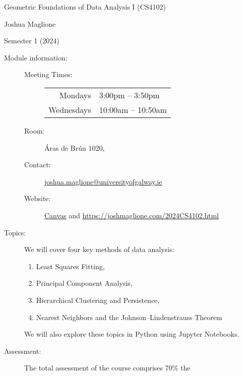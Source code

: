 \documentclass[a4paper, 12pt]{article}
\begin{document}
\pagestyle{empty}

\begin{center}
{\Large Geometric Foundations of Data Analysis I (CS4102)} 

\vspace{0.25cm}

{\large Joshua Maglione}

\vspace{0.25cm}

Semester 1 (2024)
\end{center}

\vspace{0.5cm}

\begin{description}
    \item[Module information:] \hfill
    \begin{description}
      \item[Meeting Times:] \hfill
      \begin{center}
        \begin{tabular}{rl}
          Mondays & 3:00pm -- 3:50pm \\ 
          Wednesdays & 10:00am -- 10:50am
        \end{tabular}
      \end{center}
      \item[Room:] \'Aras de Br\'un 1020,
      \item[Contact:] \url{joshua.maglione@universityofgalway.ie} 
      \item[Website:] \href{https://universityofgalway.instructure.com/}{\textsf{Canvas}} and \url{https://joshmaglione.com/2024CS4102.html} 
    \end{description} 
    \vspace{1cm}
    \item[Topics:] We will cover four key methods of data analysis:
    \begin{enumerate} 
      \item Least Squares Fitting,
      \item Principal Component Analysis,
      \item Hierarchical Clustering and Persistence,
      \item Nearest Neighbors and the Johnson--Lindenstrauss Theorem
    \end{enumerate}
    We will also explore these topics in Python using Jupyter Notebooks.
    \vspace{1cm}
    \item[Assessment:] The total assessment of the course comprises 70\% the

\end{description}
\end{document}
